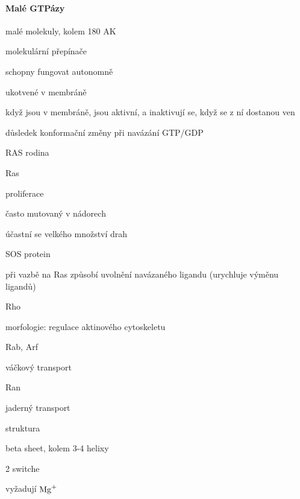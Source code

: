 \documentclass[DIV=8]{scrreprt}
\begin{document}
\paragraph{Malé GTPázy}
\begin{myItemize}[nosep]
    \item malé molekuly, kolem 180 AK
    \item molekulární přepínače
    \item schopny fungovat autonomně
    \item ukotvené v membráně
\begin{myItemize}[nosep]
    \item když jsou v membráně, jsou aktivní, a inaktivují se, když se z ní dostanou ven
    \item důsledek konformační změny při navázání GTP/GDP
\end{myItemize}

    \item RAS rodina
\begin{myItemize}[nosep]
    \item Ras
\begin{myItemize}[nosep]
    \item proliferace
    \item často mutovaný v nádorech
    \item účastní se velkého množství drah
    \item SOS protein
\begin{myItemize}[nosep]
    \item při vazbě na Ras způsobí uvolnění navázaného ligandu (urychluje výměnu ligandů)
\end{myItemize}

\end{myItemize}

    \item Rho
\begin{myItemize}[nosep]
    \item morfologie: regulace aktinového cytoskeletu
\end{myItemize}

    \item Rab, Arf
\begin{myItemize}[nosep]
    \item váčkový transport
\end{myItemize}

    \item Ran
\begin{myItemize}[nosep]
    \item jaderný transport
\end{myItemize}

\end{myItemize}

    \item struktura
\begin{myItemize}[nosep]
    \item beta sheet, kolem 3-4 helixy
    \item 2 switche
    \item vyžadují \(\ce{Mg+}\)
\end{myItemize}

\end{myItemize}
\end{document}
